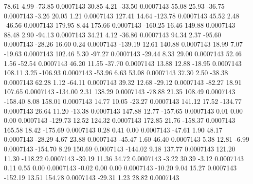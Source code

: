        78.61        4.99      -73.85     0.0007143
       30.85        4.21      -33.50     0.0007143
       55.08       25.93      -36.75     0.0007143
       -3.26       20.05        1.21     0.0007143
      127.41       14.64     -123.78     0.0007143
       45.52        2.48      -46.56     0.0007143
      179.95        8.44      175.66     0.0007143
     -160.25       16.46      149.88     0.0007143
       88.48        2.90      -94.13     0.0007143
       34.21        4.12      -36.86     0.0007143
       94.34        2.37      -95.60     0.0007143
      -28.26       16.60        0.24     0.0007143
     -139.19       12.61      140.88     0.0007143
       18.99        7.07      -19.63     0.0007143
      102.46        5.30      -97.27     0.0007143
      -29.44        8.33       29.00     0.0007143
       52.46        1.56      -52.54     0.0007143
       46.20       11.55      -37.70     0.0007143
       13.88       12.88      -18.95     0.0007143
      108.11        3.25     -106.93     0.0007143
      -53.96        6.63       53.08     0.0007143
       37.30        2.50      -38.38     0.0007143
       62.28        1.12      -64.11     0.0007143
       39.32       12.68      -29.12     0.0007143
      -82.27       18.91      107.65     0.0007143
     -134.00        2.31      138.29     0.0007143
      -78.88       21.35      108.49     0.0007143
     -158.40        8.08      158.01     0.0007143
       14.77       10.05      -23.27     0.0007143
      141.12       17.52     -134.77     0.0007143
       26.64       11.20      -13.38     0.0007143
      147.88       12.77     -157.65     0.0007143
        0.01        0.00        0.00     0.0007143
     -129.73       12.52      124.32     0.0007143
      172.85       21.76     -158.37     0.0007143
      165.58       18.42     -175.69     0.0007143
        0.28        0.41        0.00     0.0007143
      -47.61        1.90       48.17     0.0007143
      -28.29        4.67       23.88     0.0007143
      -45.47        1.60       46.40     0.0007143
        5.38       12.81       -6.99     0.0007143
     -154.70        8.29      150.69     0.0007143
     -144.02        9.18      137.77     0.0007143
      121.20       11.30     -118.22     0.0007143
      -39.19       11.36       34.72     0.0007143
       -3.22       30.39       -3.12     0.0007143
        0.11        0.55        0.00     0.0007143
       -0.02        0.00        0.00     0.0007143
      -10.20        9.04       15.27     0.0007143
     -152.19       13.51      154.78     0.0007143
      -29.31        1.23       28.82     0.0007143
